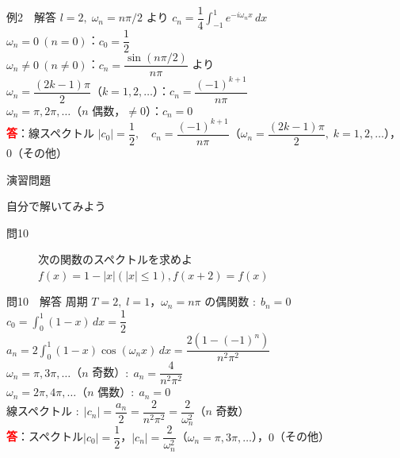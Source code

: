 \documentclass[professionalfonts]{beamer}
\begin{document}
\begin{frame}{例2　解答}
  $l=2,\; \omega_{n}=n\pi/2$ より $c_{n} = \dfrac{1}{4}\!\int_{-1}^{1} e^{-i\omega_{n}x}\,dx$\\[4pt]
  $\omega_{n}=0\ (n=0)$：$c_{0} = \dfrac{1}{2}$\\[4pt]
  $\omega_{n}\neq 0\ (n\neq 0)$：$c_{n} = \dfrac{\sin(n\pi/2)}{n\pi}$ より\\[6pt]
  \quad $\omega_{n}=\dfrac{(2k-1)\pi}{2}$（$k=1,2,\ldots$）：$c_{n} = \dfrac{(-1)^{k+1}}{n\pi}$\\[4pt]
  \quad $\omega_{n}=\pi, 2\pi,\ldots$（$n$ 偶数，$\neq 0$）：$c_{n} = 0$
  \\[8pt]\textcolor{red}{\textbf{答}}：線スペクトル\quad
  $|c_{0}|=\dfrac{1}{2},\quad c_{n}=\dfrac{(-1)^{k+1}}{n\pi}$（$\omega_{n}=\dfrac{(2k-1)\pi}{2},\; k=1,2,\ldots$），$0$（その他）
\end{frame}

\begin{frame}{演習問題}
  \begin{exampleblock}{自分で解いてみよう}
  \begin{description}
    \item[問10] 次の関数のスペクトルを求めよ
    $f(x) = 1 - |x|  (|x| \leq 1),  f(x+2) = f(x)$\\
  \end{description}
  \end{exampleblock}
\end{frame}

\begin{frame}{問10　解答}
  周期 $T=2,\; l=1$，$\omega_{n}=n\pi$ の偶関数 $:\; b_{n}=0$\\[4pt]
  $c_{0} = \displaystyle\int_{0}^1(1-x)\,dx = \dfrac{1}{2}$\\[6pt]
  $a_{n} = 2\displaystyle\int_{0}^1(1-x)\cos(\omega_{n} x)\,dx = \dfrac{2(1-(-1)^n)}{n^{2}\pi^{2}}$\\[4pt]
  \quad $\omega_{n}=\pi, 3\pi,\ldots$（$n$ 奇数）$:\; a_{n} = \dfrac{4}{n^{2}\pi^{2}}$\\[4pt]
  \quad $\omega_{n}=2\pi, 4\pi,\ldots$（$n$ 偶数）$:\; a_{n} = 0$\\[4pt]
  線スペクトル $:\; |c_{n}| = \dfrac{a_{n}}{2} = \dfrac{2}{n^{2}\pi^{2}} = \dfrac{2}{\omega_{n}^{2}}$（$n$ 奇数）
  \\[6pt]\textcolor{red}{\textbf{答}}：スペクトル\quad $|c_{0}|=\dfrac{1}{2}$，$|c_{n}|=\dfrac{2}{\omega_{n}^{2}}$（$\omega_{n}=\pi, 3\pi,\ldots$），$0$（その他）
\end{frame}
\end{document}
